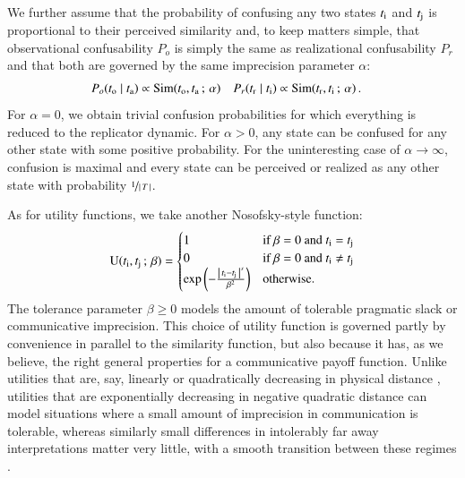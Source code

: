 \documentclass[fleqn,reqno,10pt]{article}
\newcommand{\imprecision}{\ensuremath{\alpha}} %
\newcommand{\toler}{\ensuremath{\beta}} %
\newcommand{\similarity}{\ensuremath{\mathrm{Sim}}} %
\begin{document}
We further assume that the probability of confusing any two states $t_{\mathrm{i}}$ and
$t_{\mathrm{j}}$ is proportional to their perceived similarity and, to keep matters simple, that
observational confusability $P_o$ is simply the same as realizational confusability $P_r$ and
that both are governed by the same imprecision parameter $\alpha$:
\begin{align*}
  P_o(\mystate{o} \probbar \mystate{a}) & \propto \similarity(\mystate{o}, \mystate{a} \myts ; \myts
  \imprecision) &   P_r(\mystate{r} \probbar \mystate{i}) & \propto \similarity(\mystate{r}, \mystate{i} \myts ; \myts
  \imprecision) \,.
\end{align*}
For $\imprecision = 0$, we obtain trivial confusion probabilities for which everything is reduced
to the replicator dynamic. For $\imprecision > 0$, any state can be confused for any other
state with some positive probability. For the uninteresting case of
$\imprecision \rightarrow \infty$, confusion is maximal and every state can be perceived or
realized as any other state with probability $\nicefrac{1}{\left \lvert \, T \, \right\rvert}$.

As for utility functions, we take another Nosofsky-style function:
\begin{align*}
  \util(\mystate{i}, \mystate{j} \myts ; \myts \toler) =
      \begin{cases}
    1 & \textrm{if } \toler = 0 \textrm{ and } \mystate{i} = \mystate{j} \\
    0 & \textrm{if } \toler = 0 \textrm{ and } \mystate{i} \neq \mystate{j} \\
 \expo \left ( -  \frac{\card{\mystate{i} - \mystate{j}}^s}{ \toler^2} \right ) & \textrm{otherwise.} \\
    \end{cases}
\end{align*}
The tolerance parameter $\toler \ge 0$ models the amount of tolerable pragmatic slack or
communicative imprecision. This choice of utility function is governed partly by convenience in
parallel to the similarity function, but also because it has, as we believe, the right general
properties for a communicative payoff function. Unlike utilities that are, say, linearly or
quadratically decreasing in physical distance
\citep[c.f.][]{JagerMetzger2011:Voronoi-Languag,FrankeJager2010:Vagueness-Signa}, utilities
that are exponentially decreasing in negative quadratic distance can model situations where a
small amount of imprecision in communication is tolerable, whereas similarly small differences
in intolerably far away interpretations matter very little, with a smooth transition between
these regimes \citep[c.f.][]{OConnor2013:The-Evolution-o}.
\end{document}
